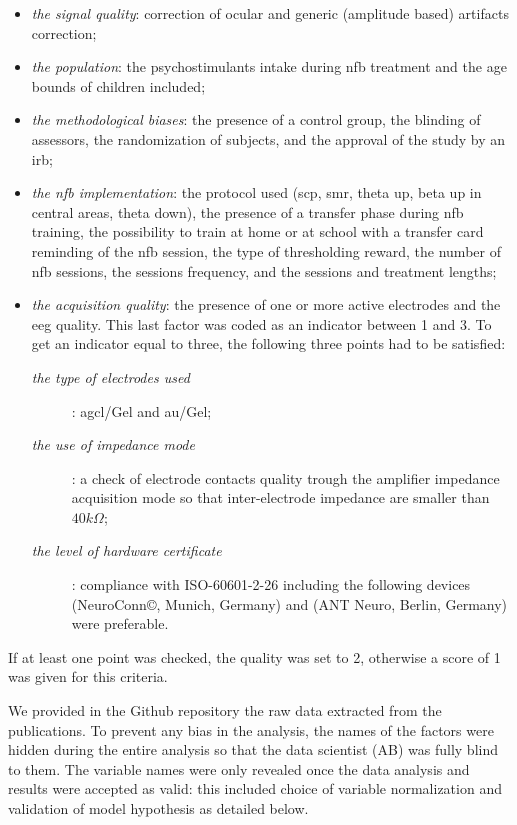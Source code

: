 \begin{itemize}
  \item \emph{the signal quality}: correction of ocular and generic (amplitude based) artifacts correction;
  \item \emph{the population}: the psychostimulants intake during \gls{nfb} treatment and the age bounds of children
  included;
  \item \emph{the methodological biases}: the presence of a control group, the blinding of assessors, 
  the randomization of subjects, and the approval of the study by an \gls{irb};
  \item \emph{the \gls{nfb} implementation}: the protocol used (\gls{scp}, \gls{smr}, 
  theta up, beta up in central areas, theta down), the presence of a transfer phase during \gls{nfb} training, the 
	possibility to train at home or at school with a transfer card reminding of the \gls{nfb} session, 
  the type of thresholding reward, the number of \gls{nfb} sessions, the sessions frequency, and the sessions and
  treatment lengths;
  \item \emph{the acquisition quality}: the presence of one or more active electrodes and the \gls{eeg} quality. 
  This last factor was coded as an indicator between 1 and 3. To get an indicator equal to three, the following three  
  points had to be satisfied: 
	\begin{description}
	  \item[\emph{the type of electrodes used}]: \gls{agcl}/Gel and \gls{au}/Gel;
    \item[\emph{the use of impedance mode}]: a check of electrode contacts quality trough the amplifier impedance
     acquisition mode so that inter-electrode impedance are smaller than $40k\Omega$;  
    \item[\emph{the level of hardware certificate}]: compliance with ISO-60601-2-26 \citep{ISO-60601-2-26:2012} including the following devices 
		\citet{TheraPrax} (NeuroConn\copyright, Munich, Germany) and \citet{Eemagine} (ANT Neuro, Berlin, Germany) were 
		preferable.
	\end{description}
\end{itemize}	
If at least one point was checked, the quality was set to 2, otherwise a score of 1 was given for this criteria.

We provided in the Github repository \citep{Bussalb2018} the raw data extracted from the publications. To prevent any
bias in the analysis, the names of the factors were hidden during the entire analysis so that the data scientist (AB) 
was fully blind to them. The variable names were only revealed once the data  analysis and results were accepted as valid: 
this included choice of variable normalization and validation of model hypothesis as detailed below.

